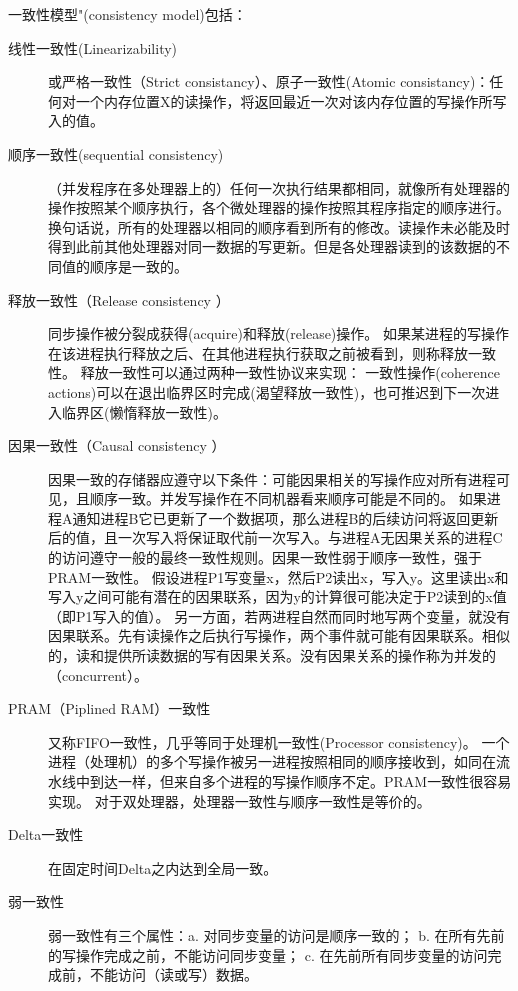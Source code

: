 一致性模型"(consistency model)包括：
\begin{description}
\item[线性一致性(Linearizability)]或严格一致性（Strict consistancy）、原子一致性(Atomic consistancy)：任何对一个内存位置X的读操作，将返回最近一次对该内存位置的写操作所写入的值。
\item[顺序一致性(sequential consistency)]（并发程序在多处理器上的）任何一次执行结果都相同，就像所有处理器的操作按照某个顺序执行，各个微处理器的操作按照其程序指定的顺序进行。
换句话说，所有的处理器以相同的顺序看到所有的修改。读操作未必能及时得到此前其他处理器对同一数据的写更新。但是各处理器读到的该数据的不同值的顺序是一致的。
\item[释放一致性（Release consistency ）]
同步操作被分裂成获得(acquire)和释放(release)操作。
如果某进程的写操作在该进程执行释放之后、在其他进程执行获取之前被看到，则称释放一致性。
释放一致性可以通过两种一致性协议来实现：
一致性操作(coherence actions)可以在退出临界区时完成(渴望释放一致性)，也可推迟到下一次进入临界区(懒惰释放一致性)。
\item[因果一致性（Causal consistency ）]
因果一致的存储器应遵守以下条件：可能因果相关的写操作应对所有进程可见，且顺序一致。并发写操作在不同机器看来顺序可能是不同的。
如果进程A通知进程B它已更新了一个数据项，那么进程B的后续访问将返回更新后的值，且一次写入将保证取代前一次写入。与进程A无因果关系的进程C的访问遵守一般的最终一致性规则。因果一致性弱于顺序一致性，强于PRAM一致性。
假设进程P1写变量x，然后P2读出x，写入y。这里读出x和写入y之间可能有潜在的因果联系，因为y的计算很可能决定于P2读到的x值（即P1写入的值）。 另一方面，若两进程自然而同时地写两个变量，就没有因果联系。先有读操作之后执行写操作，两个事件就可能有因果联系。相似的，读和提供所读数据的写有因果关系。没有因果关系的操作称为并发的（concurrent）。
\item[PRAM（Piplined RAM）一致性]又称FIFO一致性，几乎等同于处理机一致性(Processor consistency)。
一个进程（处理机）的多个写操作被另一进程按照相同的顺序接收到，如同在流水线中到达一样，但来自多个进程的写操作顺序不定。PRAM一致性很容易实现。
对于双处理器，处理器一致性与顺序一致性是等价的。
\item[Delta一致性]在固定时间Delta之内达到全局一致。
\item[弱一致性]弱一致性有三个属性：a. 对同步变量的访问是顺序一致的；
b. 在所有先前的写操作完成之前，不能访问同步变量；
c. 在先前所有同步变量的访问完成前，不能访问（读或写）数据。
\end{description}













\clearpage